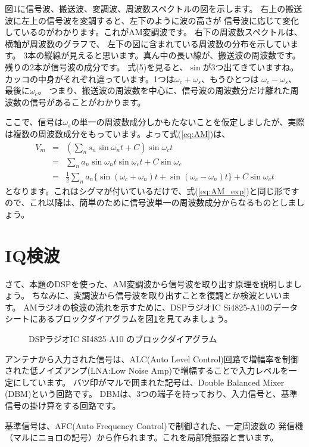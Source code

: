 図1に信号波、搬送波、変調波、周波数スペクトルの図を示します。
右上の搬送波に左上の信号波を変調すると、左下のように波の高さが
信号波に応じて変化しているのがわかります。これがAM変調波です。
右下の周波数スペクトルは、横軸が周波数のグラフで、
左下の図に含まれている周波数の分布を示しています。
3本の縦線が見えると思います。真ん中の長い線が、搬送波の周波数です。
残りの2本が信号波の成分です。
式(5)を見ると、$\sin$が3つ出てきていますね。
カッコの中身がそれぞれ違っています。1つは$\omega_c + \omega_s$、もうひとつは
$\omega_c - \omega_s$、最後に$\omega_c$。
つまり、搬送波の周波数を中心に、信号波の周波数分だけ離れた周波数の信号があることがわかります。

ここで、信号は$\omega_s$の単一の周波数成分しかもたないことを仮定しましたが、実際は複数の周波数成分をもっています。よって式(\ref{eq:AM})は、
\begin{eqnarray}
V_m &=&  (\sum_n s_n\sin\omega_n t + C)\sin\omega_c t \nonumber \\
&=& \sum_n a_n\sin\omega_n t \sin\omega_c t + C\sin\omega_c \nonumber \\
&=& \frac{1}{2}\sum_n{a_n\{\sin(\omega_c + \omega_n)t + \sin(\omega_c - \omega_n)t}\} + C\sin\omega_ct \nonumber
\end{eqnarray}
となります。これはシグマが付いているだけで、式(\ref{eq:AM_exp})と同じ形ですので、これ以降は、簡単のために信号波単一の周波数成分からなるものとしましょう。

\section*{IQ検波}
さて、本題のDSPを使った、AM変調波から信号波を取り出す原理を説明しましょう。
ちなみに、変調波から信号波を取り出すことを復調とか検波といいます。
AMラジオの検波の流れを示すために、DSPラジオIC Si4825-A10のデータシートにあるブロックダイアグラムを図\ref{fig:block}を見てみましょう。


\begin{figure}
\caption{DSPラジオIC SI4825-A10 のブロックダイアグラム}
\label{fig:block}
\end{figure}

アンテナから入力された信号は、ALC(Auto Level Control)回路で増幅率を制御された低ノイズアンプ(LNA:Low Noise Amp)で増幅することで入力レベルを一定にしています。
バツ印がマルで囲まれた記号は、Double Balanced Mixer (DBM)という回路です。
DBMは、3つの端子を持っており、入力信号と、基準信号の掛け算をする回路です。

基準信号は、AFC(Auto Frequency Control)で制御された、一定周波数の
発信機（マルにニョロの記号）から作られます。これを局部発振器と言います。

